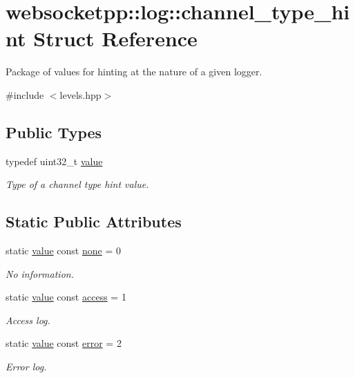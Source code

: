 \hypertarget{structwebsocketpp_1_1log_1_1channel__type__hint}{}\section{websocketpp\+:\+:log\+:\+:channel\+\_\+type\+\_\+hint Struct Reference}
\label{structwebsocketpp_1_1log_1_1channel__type__hint}


Package of values for hinting at the nature of a given logger.  




{\ttfamily \#include $<$levels.\+hpp$>$}

\subsection*{Public Types}
\begin{DoxyCompactItemize}
\item 
typedef uint32\+\_\+t \hyperlink{structwebsocketpp_1_1log_1_1channel__type__hint_ad12a7f6555b71aabdc4cbec604dc89dd}{value}
\begin{DoxyCompactList}\small\item\em Type of a channel type hint value. \end{DoxyCompactList}\end{DoxyCompactItemize}
\subsection*{Static Public Attributes}
\begin{DoxyCompactItemize}
\item 
static \hyperlink{structwebsocketpp_1_1log_1_1channel__type__hint_ad12a7f6555b71aabdc4cbec604dc89dd}{value} const \hyperlink{structwebsocketpp_1_1log_1_1channel__type__hint_a2e7de3c97193085a20b7bb42815d23e2}{none} = 0
\begin{DoxyCompactList}\small\item\em No information. \end{DoxyCompactList}\item 
static \hyperlink{structwebsocketpp_1_1log_1_1channel__type__hint_ad12a7f6555b71aabdc4cbec604dc89dd}{value} const \hyperlink{structwebsocketpp_1_1log_1_1channel__type__hint_a8c38587fffbffbfcfc35577734b0d653}{access} = 1
\begin{DoxyCompactList}\small\item\em Access log. \end{DoxyCompactList}\item 
static \hyperlink{structwebsocketpp_1_1log_1_1channel__type__hint_ad12a7f6555b71aabdc4cbec604dc89dd}{value} const \hyperlink{structwebsocketpp_1_1log_1_1channel__type__hint_a91473ac49fba696549da438483a6fe31}{error} = 2
\begin{DoxyCompactList}\small\item\em Error log. \end{DoxyCompactList}\end{DoxyCompactItemize}


